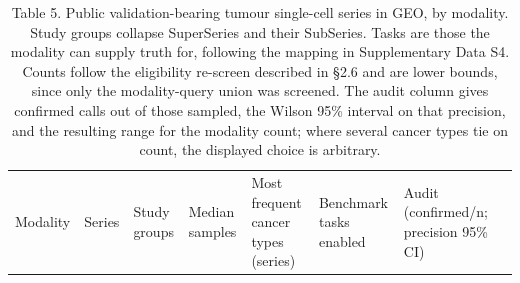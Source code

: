 \documentclass[11pt]{article}
\begin{document}
\begin{scriptsize}

\begin{longtable}[]{@{}
  >{\raggedright\arraybackslash}p{}
  >{\raggedright\arraybackslash}p{}
  >{\raggedright\arraybackslash}p{}
  >{\raggedright\arraybackslash}p{}
  >{\raggedright\arraybackslash}p{}
  >{\raggedright\arraybackslash}p{}
  >{\raggedright\arraybackslash}p{}
  >{\raggedright\arraybackslash}p{}@{}}
\caption{Table 5. Public validation-bearing tumour single-cell series in
GEO, by modality. Study groups collapse SuperSeries and their SubSeries.
Tasks are those the modality can supply truth for, following the mapping
in Supplementary Data S4. Counts follow the eligibility re-screen
described in §2.6 and are lower bounds, since only the modality-query
union was screened. The audit column gives confirmed calls out of those
sampled, the Wilson 95\% interval on that precision, and the resulting
range for the modality count; where several cancer types tie on count,
the displayed choice is arbitrary.}\tabularnewline
\toprule\noalign{}
\begin{minipage}[b]{\linewidth}\raggedright
Modality
\end{minipage} & \begin{minipage}[b]{\linewidth}\raggedright
Series
\end{minipage} & \begin{minipage}[b]{\linewidth}\raggedright
Study groups
\end{minipage} & \begin{minipage}[b]{\linewidth}\raggedright
Median samples
\end{minipage} & \begin{minipage}[b]{\linewidth}\raggedright
Most frequent cancer types (series)
\end{minipage} & \begin{minipage}[b]{\linewidth}\raggedright
Benchmark tasks enabled
\end{minipage} & \begin{minipage}[b]{\linewidth}\raggedright
Audit (confirmed/n; precision 95\% CI)
\end{minipage} & \begin{minipage}[b]{\linewidth}\raggedright

\end{minipage}
\end{longtable}
\end{scriptsize}
\end{document}
